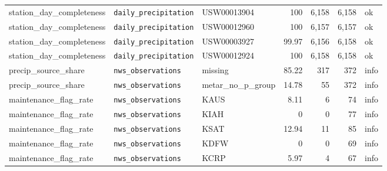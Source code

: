 \begin{table}[H]
\begin{tabular}{@{}lllrrrl@{}}
station\_day\_completeness & \texttt{daily\_precipitation} & USW00013904 & 100 & 6,158 & 6,158 & ok\\
station\_day\_completeness & \texttt{daily\_precipitation} & USW00012960 & 100 & 6,157 & 6,157 & ok\\
station\_day\_completeness & \texttt{daily\_precipitation} & USW00003927 & 99.97 & 6,156 & 6,158 & ok\\
station\_day\_completeness & \texttt{daily\_precipitation} & USW00012924 & 100 & 6,158 & 6,158 & ok\\
precip\_source\_share & \texttt{nws\_observations} & missing & 85.22 & 317 & 372 & info\\
precip\_source\_share & \texttt{nws\_observations} & metar\_no\_p\_group & 14.78 & 55 & 372 & info\\
maintenance\_flag\_rate & \texttt{nws\_observations} & KAUS & 8.11 & 6 & 74 & info\\
maintenance\_flag\_rate & \texttt{nws\_observations} & KIAH & 0 & 0 & 77 & info\\
maintenance\_flag\_rate & \texttt{nws\_observations} & KSAT & 12.94 & 11 & 85 & info\\
maintenance\_flag\_rate & \texttt{nws\_observations} & KDFW & 0 & 0 & 69 & info\\
maintenance\_flag\_rate & \texttt{nws\_observations} & KCRP & 5.97 & 4 & 67 & info\\
\bottomrule\end{tabular}\end{table}